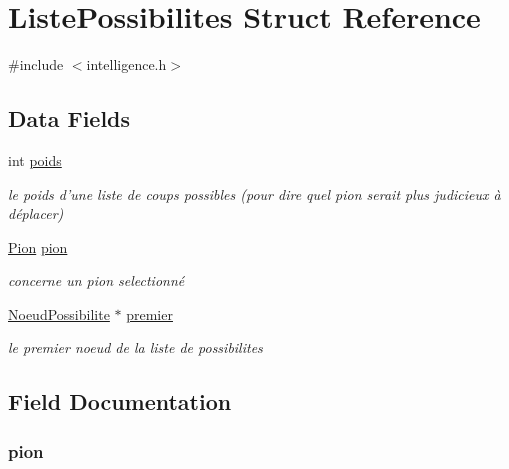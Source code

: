 \hypertarget{struct_liste_possibilites}{\section{Liste\-Possibilites Struct Reference}
\label{struct_liste_possibilites}
}


{\ttfamily \#include $<$intelligence.\-h$>$}

\subsection*{Data Fields}
\begin{DoxyCompactItemize}
\item 
int \hyperlink{struct_liste_possibilites_ac1abe8fa63a4167cf11ef707f524f0c4}{poids}
\begin{DoxyCompactList}\small\item\em le poids d'une liste de coups possibles (pour dire quel pion serait plus judicieux à déplacer) \end{DoxyCompactList}\item 
\hyperlink{struct_pion}{Pion} \hyperlink{struct_liste_possibilites_ad71b3ad38e648f9979a7e37f3ac0c258}{pion}
\begin{DoxyCompactList}\small\item\em concerne un pion selectionné \end{DoxyCompactList}\item 
\hyperlink{struct_noeud_possibilite}{Noeud\-Possibilite} $\ast$ \hyperlink{struct_liste_possibilites_a9887300a868bffa9377c72541e175906}{premier}
\begin{DoxyCompactList}\small\item\em le premier noeud de la liste de possibilites \end{DoxyCompactList}\end{DoxyCompactItemize}


\subsection{Field Documentation}
\hypertarget{struct_liste_possibilites_ad71b3ad38e648f9979a7e37f3ac0c258}{
\subsubsection[{pion}]{ pion}}\label{struct_liste_possibilites_ad71b3ad38e648f9979a7e37f3ac0c258}


